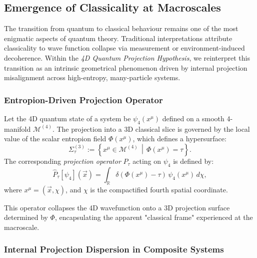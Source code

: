 \documentclass[12pt]{article}
\begin{document}
\subsection{Emergence of Classicality at Macroscales}
\label{subsec:classicality_macroscales}

The transition from quantum to classical behaviour remains one of the most enigmatic aspects of quantum theory. Traditional interpretations attribute classicality to wave function collapse via measurement or environment-induced decoherence. Within the \emph{4D Quantum Projection Hypothesis}, we reinterpret this transition as an intrinsic geometrical phenomenon driven by internal projection misalignment across high-entropy, many-particle systems.

\subsubsection*{Entropion-Driven Projection Operator}

Let the 4D quantum state of a system be $\psi_4(x^\mu)$ defined on a smooth 4-manifold $\mathcal{M}^{(4)}$. The projection into a 3D classical slice is governed by the local value of the scalar entropion field $\Phi(x^\mu)$, which defines a hypersurface:
\begin{equation}
\label{eq:projection_surface}
\Sigma_\tau^{(3)} := \left\{ x^\mu \in \mathcal{M}^{(4)} \,\middle|\, \Phi(x^\mu) = \tau \right\}.
\end{equation}
The corresponding \emph{projection operator} $\hat{P}_\tau$ acting on $\psi_4$ is defined by:
\begin{equation}
\label{eq:projection_operator}
\hat{P}_\tau[\psi_4](\vec{x}) = \int_{\mathbb{R}} \delta(\Phi(x^\mu) - \tau) \, \psi_4(x^\mu) \, d\chi,
\end{equation}
where $x^\mu = (\vec{x}, \chi)$, and $\chi$ is the compactified fourth spatial coordinate.

This operator collapses the 4D wavefunction onto a 3D projection surface determined by $\Phi$, encapsulating the apparent "classical frame" experienced at the macroscale.

\subsubsection*{Internal Projection Dispersion in Composite Systems}
\end{document}
